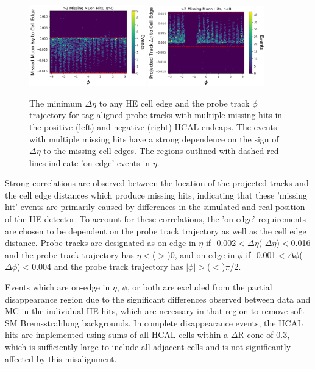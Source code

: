\begin{figure}[htpb]
    \includegraphics[width=0.45\textwidth]{figures/posEtaEdgeEventsData.png} 
    \hspace{0.01\textwidth}
    \includegraphics[width=0.45\textwidth]{figures/negEtaEdgeEventsData.png}
    \centering
	\caption[$\eta$ edge correlations in missing HCAL muon hits.]{The minimum $\Delta\eta$ to any HE cell edge and the probe track $\phi$ trajectory for tag-aligned probe tracks with multiple missing hits in the positive (left) and negative (right) HCAL endcaps. The events with multiple missing hits have a strong dependence on the sign of $\Delta\eta$ to the missing cell edges. The regions outlined with dashed red lines indicate 'on-edge' events in $\eta$.}
    \label{fig:etaEdgeCorr}
\end{figure}

Strong correlations are observed between the location of the projected tracks and the cell edge distances which produce missing hits, indicating that these 'missing hit' events are primarily caused by differences in the simulated and real position of the HE detector.
To account for these correlations, the 'on-edge' requirements are chosen to be dependent on the probe track trajectory as well as the cell edge distance. 
Probe tracks are designated as on-edge in $\eta$ if -0.002$<\Delta\eta$(-$\Delta\eta$)$<$0.016 and the probe track trajectory has $\eta<$($>$)$0$, and on-edge in $\phi$ if -0.001$<\Delta\phi$(-$\Delta\phi$)$<$0.004 and the probe track trajectory has $|\phi|>$($<$)$\pi/$2.

Events which are on-edge in $\eta$, $\phi$, or both are excluded from the partial disappearance region due to the significant differences observed between data and MC in the individual HE hits, which are necessary in that region to remove soft SM Bremsstrahlung backgrounds.
In complete disappearance events, the HCAL hits are implemented using sums of all HCAL cells within a $\Delta$R cone of 0.3, which is sufficiently large to include all adjacent cells and is not significantly affected by this misalignment.

